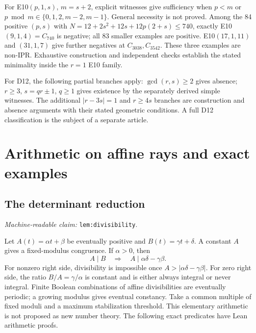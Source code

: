 \documentclass[11pt]{amsart}
\newcommand{\record}[1]{\nolinkurl{#1}}
\newcommand{\claimid}[1]{\par\nopagebreak\noindent\textit{Machine-readable claim:} \record{#1}.\par}
\theoremstyle{definition}\newtheorem{definition}{Definition}
\begin{document}
For E10$(p,1,s)$, $m=s+2$, explicit witnesses give
sufficiency when $p<m$ or
$p\bmod m\in\{0,1,2,m-2,m-1\}$. General necessity is not proved.
Among the 84 positive $(p,s)$ with
$N=12+2s^2+12s+12p(2+s)\le740$, exactly E10$(9,1,4)=C_{740}$
is negative; all 83 smaller examples are positive. E10$(17,1,11)$
and $(31,1,7)$ give further negatives at $C_{3038},C_{3542}$.
These three examples are non-IPR. Exhaustive construction and
independent checks establish the stated minimality inside the $r=1$
E10 family.

For D12, the following partial branches apply:
$\gcd(r,s)\ge2$ gives absence; $r\ge3$, $s=qr\pm1$, $q\ge1$
gives existence by the separately derived simple witnesses. The
additional $|r-3s|=1$ and $r\ge4s$ branches are construction and
absence arguments with their stated geometric conditions. A full D12
classification is the subject of a separate article.

\section{Arithmetic on affine rays and exact examples}\label{sec:arithmetic}
\subsection{The determinant reduction}\label{lem:divisibility}
\claimid{lem:divisibility}
Let $A(t)=\alpha t+\beta$ be eventually positive and
$B(t)=\gamma t+\delta$. A constant $A$ gives a fixed-modulus
congruence. If $\alpha>0$, then
\begin{equation}\label{eq:determinant}
 A\mid B\quad\Longrightarrow\quad A\mid\alpha\delta-\gamma\beta.
\end{equation}
For nonzero right side, divisibility is impossible once
$A>|\alpha\delta-\gamma\beta|$. For zero right side, the ratio
$B/A=\gamma/\alpha$ is constant and is either always integral or
never integral. Finite Boolean combinations of affine divisibilities
are eventually periodic; a growing modulus gives eventual constancy.
Take a common multiple of fixed moduli and a maximum stabilization
threshold. This elementary arithmetic is not proposed as new number
theory. The following exact predicates have Lean arithmetic proofs.
\end{document}
